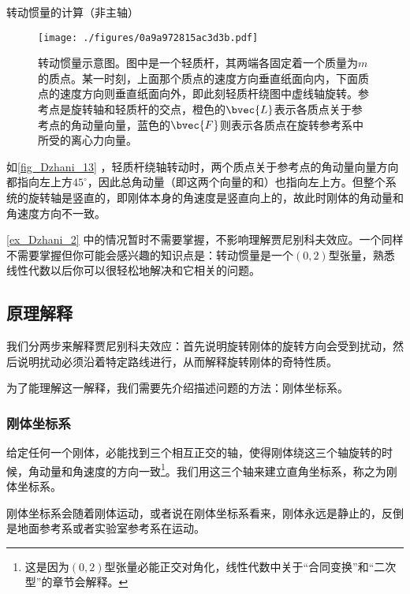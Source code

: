 \begin{example}{转动惯量的计算（非主轴）}\label{ex_Dzhani_2}


\begin{figure}[ht]
\centering
\texttt{[image: ./figures/0a9a972815ac3d3b.pdf]}
\caption{转动惯量示意图。图中是一个轻质杆，其两端各固定着一个质量为$m$的质点。某一时刻，上面那个质点的速度方向垂直纸面向内，下面质点的速度方向则垂直纸面向外，即此刻轻质杆绕图中虚线轴旋转。参考点是旋转轴和轻质杆的交点，橙色的$\bvec{L}$表示各质点关于参考点的角动量向量，蓝色的$\bvec{F}$则表示各质点在旋转参考系中所受的离心力向量。} \label{fig_Dzhani_13}
\end{figure}

如\autoref{fig_Dzhani_13} ，轻质杆绕轴转动时，两个质点关于参考点的角动量向量方向都指向左上方$45^\circ$，因此总角动量（即这两个向量的和）也指向左上方。但整个系统的旋转轴是竖直的，即刚体本身的角速度是竖直向上的，故此时刚体的角动量和角速度方向不一致。


\end{example}


\autoref{ex_Dzhani_2} 中的情况暂时不需要掌握，不影响理解贾尼别科夫效应。一个同样不需要掌握但你可能会感兴趣的知识点是：转动惯量是一个$(0, 2)$型张量，熟悉线性代数以后你可以很轻松地解决和它相关的问题。





\subsection{原理解释}

我们分两步来解释贾尼别科夫效应：首先说明旋转刚体的旋转方向会受到扰动，然后说明扰动必须沿着特定路线进行，从而解释旋转刚体的奇特性质。

为了能理解这一解释，我们需要先介绍描述问题的方法：刚体坐标系。

\subsubsection{刚体坐标系}



给定任何一个刚体，必能找到三个相互正交的轴，使得刚体绕这三个轴旋转的时候，角动量和角速度的方向一致\footnote{这是因为$(0, 2)$型张量必能正交对角化，线性代数中关于“合同变换”和“二次型”的章节会解释。}。我们用这三个轴来建立直角坐标系，称之为刚体坐标系。

刚体坐标系会随着刚体运动，或者说在刚体坐标系看来，刚体永远是静止的，反倒是地面参考系或者实验室参考系在运动。


